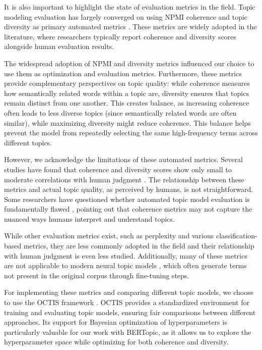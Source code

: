 It is also important to highlight the state of evaluation metrics in the field. Topic modeling evaluation has largely converged on using NPMI coherence and topic diversity as primary automated metrics \cite{doogan_topic_2021, hoyle_is_2021, mimno_optimizing_nodate, lau_machine_2014}. These metrics are widely adopted in the literature, where researchers typically report coherence and diversity scores alongside human evaluation results.

The widespread adoption of NPMI and diversity metrics influenced our choice to use them as optimization and evaluation metrics. Furthermore, these metrics provide complementary perspectives on topic quality: while coherence measures how semantically related words within a topic are, diversity ensures that topics remain distinct from one another. This creates balance, as increasing coherence often leads to less diverse topics (since semantically related words are often similar), while maximizing diversity might reduce coherence. This balance helps prevent the model from repeatedly selecting the same high-frequency terms across different topics.

However, we acknowledge the limitations of these automated metrics. Several studies have found that coherence and diversity scores show only small to moderate correlations with human judgment \cite{doogan_topic_2021, hoyle_is_2021}. The relationship between these metrics and actual topic quality, as perceived by humans, is not straightforward. Some researchers have questioned whether automated topic model evaluation is fundamentally flawed \cite{hoyle_is_2021}, pointing out that coherence metrics may not capture the nuanced ways humans interpret and understand topics.

While other evaluation metrics exist, such as perplexity and various classification-based metrics, they are less commonly adopted in the field and their relationship with human judgment is even less studied. Additionally, many of these metrics are not applicable to modern neural topic models \cite{doogan_topic_2021}, which often generate terms not present in the original corpus through fine-tuning steps.

For implementing these metrics and comparing different topic models, we choose to use the OCTIS framework \cite{terragni_octis_2021}. OCTIS provides a standardized environment for training and evaluating topic models, ensuring fair comparisons between different approaches. Its support for Bayesian optimization of hyperparameters is particularly valuable for our work with BERTopic, as it allows us to explore the hyperparameter space while optimizing for both coherence and diversity.

